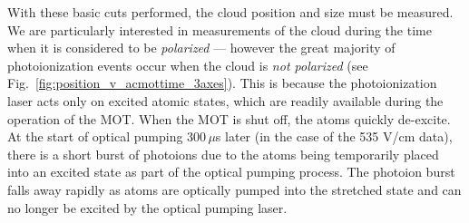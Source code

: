 With these basic cuts performed, the cloud position and size must be measured.  We are particularly interested in measurements of the cloud during the time when it is considered to be \emph{polarized} --- however the great majority of photoionization events occur when the cloud is \emph{not polarized} (see Fig.~\ref{fig:position_v_acmottime_3axes}).  This is because the photoionization laser acts only on excited atomic states, which are readily available during the operation of the \ac{MOT}.  When the \ac{MOT} is shut off, the atoms quickly de-excite.  At the start of optical pumping 300$\,\mu$s later (in the case of the 535 V/cm data), there is a short burst of photoions due to the atoms being temporarily placed into an excited state as part of the optical pumping process.  The photoion burst falls away rapidly as atoms are optically pumped into the stretched state and can no longer be excited by the optical pumping laser.  


